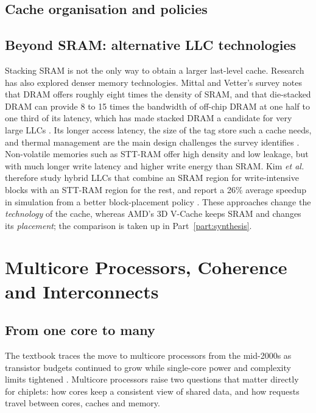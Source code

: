 \subsection{Cache organisation and policies}

\subsection{Beyond SRAM: alternative LLC technologies}
Stacking SRAM is not the only way to obtain a larger last-level cache. Research has also explored denser memory technologies. Mittal and Vetter's survey notes that DRAM offers roughly eight times the density of SRAM, and that die-stacked DRAM can provide 8 to 15 times the bandwidth of off-chip DRAM at one half to one third of its latency, which has made stacked DRAM a candidate for very large LLCs \cite[sec.~1]{mittalSurveyTechniquesArchitecting2016}. Its longer access latency, the size of the tag store such a cache needs, and thermal management are the main design challenges the survey identifies \cite[secs.~1--2]{mittalSurveyTechniquesArchitecting2016}. Non-volatile memories such as STT-RAM offer high density and low leakage, but with much longer write latency and higher write energy than SRAM. Kim \emph{et al.} therefore study hybrid LLCs that combine an SRAM region for write-intensive blocks with an STT-RAM region for the rest, and report a 26\% average speedup in simulation from a better block-placement policy \cite{kimExploitingDataCompression2022}. These approaches change the \emph{technology} of the cache, whereas AMD's 3D V-Cache keeps SRAM and changes its \emph{placement}; the comparison is taken up in Part~\ref{part:synthesis}.

\section{Multicore Processors, Coherence and Interconnects}
\label{sec:multicore}

\subsection{From one core to many}
The textbook traces the move to multicore processors from the mid-2000s as transistor budgets continued to grow while single-core power and complexity limits tightened \cite[sec.~12.1]{sarangi2025basic}. Multicore processors raise two questions that matter directly for chiplets: how cores keep a consistent view of shared data, and how requests travel between cores, caches and memory.

